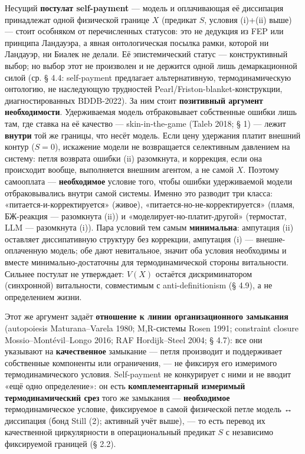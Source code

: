 \documentclass[pdflatex,sn-mathphys-ay]{sn-jnl}
\begin{document}
Несущий \textbf{постулат self-payment} --- модель и оплачивающая её диссипация принадлежат одной физической границе \(X\) (предикат \(S\), условия (i)+(ii) выше) --- стоит особняком от перечисленных статусов: это не дедукция из FEP или принципа Ландауэра, а явная онтологическая посылка рамки, которой ни Ландауэр, ни Биалек не делали. Её эпистемический статус --- конструктивный выбор; но выбор этот не произволен и не держится одной лишь демаркационной силой (ср. § 4.4: self-payment предлагает альтернативную, термодинамическую онтологию, не наследующую трудностей Pearl/Friston-blanket-конструкции, диагностированных BDDB-2022). За ним стоит \textbf{позитивный аргумент необходимости}. Удерживаемая модель отбраковывает собственные ошибки лишь там, где ставка на её качество --- skin-in-the-game (Taleb 2018; § 1) --- лежит \textbf{внутри} той же границы, что несёт модель. Если цену удержания платит внешний контур (\(S = 0\)), искажение модели не возвращается селективным давлением на систему: петля возврата ошибки (ii) разомкнута, и коррекция, если она происходит вообще, выполняется внешним агентом, а не самой \(X\). Поэтому самооплата --- \textbf{необходимое} условие того, чтобы ошибки удерживаемой модели отбраковывались внутри самой системы. Именно это разводит три класса: «питается-и-корректируется» (живое), «питается-но-не-корректируется» (пламя, БЖ-реакция --- разомкнута (ii)) и «моделирует-но-платит-другой» (термостат, LLM --- разомкнута (i)). Пара условий тем самым \textbf{минимальна}: ампутация (ii) оставляет диссипативную структуру без коррекции, ампутация (i) --- внешне-оплаченную модель; обе дают невитальное, значит оба условия необходимы и вместе минимально-достаточны для термодинамической стороны витальности. Сильнее постулат не утверждает: \(V(X)\) остаётся дискриминатором (синхронной) витальности, совместимым с anti-definitionism (§ 4.9), а не определением жизни.

Этот же аргумент задаёт \textbf{отношение к линии организационного замыкания} (autopoiesis Maturana--Varela 1980; M,R-системы Rosen 1991; constraint closure Mossio--Montévil--Longo 2016; RAF Hordijk--Steel 2004; § 4.7): все они указывают на \textbf{качественное} замыкание --- петля производит и поддерживает собственные компоненты или ограничения, --- не фиксируя его измеримого термодинамического условия. Self-payment не конкурирует с ними и не вводит «ещё одно определение»: он есть \textbf{комплементарный измеримый термодинамический срез} того же замыкания --- \textbf{необходимое} термодинамическое условие, фиксируемое в самой физической петле модель ↔ диссипация (бонд Still (2); активный учёт выше), --- то есть перевод их качественной циркулярности в операциональный предикат \(S\) с независимо фиксируемой границей (§ 2.2).
\end{document}
